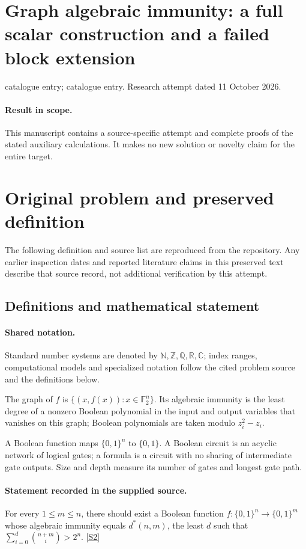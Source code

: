 \documentclass[11pt]{article}
\begin{document}
\section*{Graph algebraic immunity: a full scalar construction and a failed block extension}
\noindent catalogue entry; catalogue entry. Research attempt dated 11 October 2026.
\paragraph{Result in scope.}This manuscript contains a source-specific attempt and complete proofs of the stated auxiliary calculations. It makes no new solution or novelty claim for the entire target.
\section{Original problem and preserved definition}
The following definition and source list are reproduced from the repository. Any earlier inspection dates and reported literature claims in this preserved text describe that source record, not additional verification by this attempt.
\subsection{Definitions and mathematical statement}

\paragraph{Shared notation.}Standard number systems are denoted by $\mathbb N,\mathbb Z,\mathbb Q,\mathbb R,\mathbb C$; index ranges, computational models and specialized notation follow the cited problem source and the definitions below.


The graph of $f$ is $\{(x,f(x)):x\in\mathbb F_2^n\}$. Its algebraic immunity is the least degree of a nonzero Boolean polynomial in the input and output variables that vanishes on this graph; Boolean polynomials are taken modulo $z_i^2-z_i$.

A Boolean function maps $\{0,1\}^n$ to $\{0,1\}$. A Boolean circuit is an acyclic network of logical gates; a formula is a circuit with no sharing of intermediate gate outputs. Size and depth measure its number of gates and longest gate path.
\paragraph{Statement recorded in the supplied source.}
For every $1\leq m\leq n$, there should exist a Boolean function $f:\{0,1\}^n\to\{0,1\}^m$ whose algebraic immunity equals $d^*(n,m)$, the least $d$ such that $\sum_{i=0}^d\binom{n+m}{i}>2^n$. \href{https://doi.org/10.4171/owr/2007/31}{[S2]}
\end{document}
